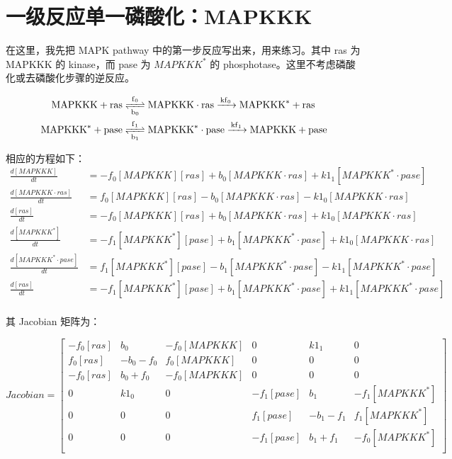 \section{一级反应单一磷酸化：MAPKKK}
在这里，我先把 MAPK pathway 中的第一步反应写出来，用来练习。其中 ras 为 MAPKKK 的 kinase，而 pase 为 $MAPKKK^{*}$ 的 phosphotase。这里不考虑磷酸化或去磷酸化步骤的逆反应。

\begin{align*}
  \ce{MAPKKK + ras &<=>[f_{0}][b_{0}] MAPKKK\cdot{}ras ->[kf_{0}] MAPKKK^{*} + ras\\
    MAPKKK^{*} + pase &<=>[f_{1}][b_{1}] MAPKKK^{*}\cdot{}pase ->[kf_{1}] MAPKKK + pase}
\end{align*}

相应的方程如下：
\small
\begin{equation*}
  \begin{align*}
    \frac{d[MAPKKK]}{dt} &= -f_{0}[MAPKKK][ras] + b_{0}[MAPKKK\cdot{}ras] + k1_{1}[MAPKKK^{*}\cdot{}pase]\\
    \frac{d[MAPKKK\cdot{}ras]}{dt} &= f_{0}[MAPKKK][ras] - b_{0}[MAPKKK\cdot{}ras] - k1_{0}[MAPKKK\cdot{}ras]\\
    \frac{d[ras]}{dt} &= -f_{0}[MAPKKK][ras] + b_{0}[MAPKKK \cdot{}ras] + k1_{0}[MAPKKK\cdot{}ras]\\
    \frac{d[MAPKKK^{*}]}{dt} &= -f_{1}[MAPKKK^{*}][pase] + b_{1}[MAPKKK^{*}\cdot{}pase] + k1_{0}[MAPKKK\cdot{}ras]\\
    \frac{d[MAPKKK^{*}\cdot{}pase]}{dt} &= f_{1}[MAPKKK^{*}][pase] - b_{1}[MAPKKK^{*}\cdot{}pase] - k1_{1}[MAPKKK^{*}\cdot{}pase]\\
    \frac{d[ras]}{dt} &= -f_{1}[MAPKKK^{*}][pase] + b_{1}[MAPKKK^{*}\cdot{}pase] + k1_{1}[MAPKKK^{*}\cdot{}pase]\\
  \end{align*}
\end{equation*}
\normalsize

其 Jacobian 矩阵为：

\small
\begin{displaymath}
  Jacobian =
  \left[
    \begin{array}{cccccc}
      -f_{0}[ras] & b_{0} & -f_{0}[MAPKKK] & 0 & k1_{1} & 0 \\
      f_{0}[ras] & -b_{0} - f_{0} & f_{0}[MAPKKK] & 0 & 0 & 0 \\
      -f_{0}[ras] & b_{0} + f_{0} & -f_{0}[MAPKKK] & 0 & 0 & 0 \\
      0 & k1_{0} & 0 & -f_{1}[pase] & b_{1} & -f_{1}[MAPKKK^{*}] \\
      0 & 0 & 0 & f_{1}[pase] & -b_{1} - f_{1} & f_{1}[MAPKKK^{*}] \\
      0 & 0 & 0 & -f_{1}[pase] & b_{1} + f_{1} & -f_{0}[MAPKKK^{*}] \\
    \end{array}
  \right]
\end{displaymath}
\normalsize


